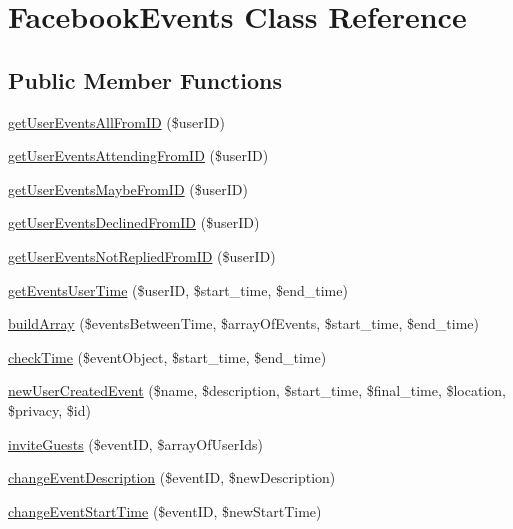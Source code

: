 \hypertarget{class_facebook_events}{
\section{FacebookEvents Class Reference}
\label{class_facebook_events}
}
\subsection*{Public Member Functions}
\begin{DoxyCompactItemize}
\item 
\hyperlink{class_facebook_events_aceabf698274599a0fc986f966aadb6ac}{getUserEventsAllFromID} (\$userID)
\item 
\hyperlink{class_facebook_events_a8dcdbfe286fc3b1290a7aa1fc20b79f9}{getUserEventsAttendingFromID} (\$userID)
\item 
\hyperlink{class_facebook_events_af08f78a39ff1e9f5fc2314e46411cb3b}{getUserEventsMaybeFromID} (\$userID)
\item 
\hyperlink{class_facebook_events_a89c184fbbc304311da7be09777e06962}{getUserEventsDeclinedFromID} (\$userID)
\item 
\hyperlink{class_facebook_events_a67ebbba9957c4c8862ea8579d952e2f9}{getUserEventsNotRepliedFromID} (\$userID)
\item 
\hyperlink{class_facebook_events_a750ef224c26f52fc33bcea71e7f952b0}{getEventsUserTime} (\$userID, \$start\_\-time, \$end\_\-time)
\item 
\hyperlink{class_facebook_events_ad8da519a91b9f6b34a69d521b3efe140}{buildArray} (\$eventsBetweenTime, \$arrayOfEvents, \$start\_\-time, \$end\_\-time)
\item 
\hyperlink{class_facebook_events_a5281d3844901979cb5404b168704f69a}{checkTime} (\$eventObject, \$start\_\-time, \$end\_\-time)
\item 
\hyperlink{class_facebook_events_ab0f25430d77364fda078b22836132ef1}{newUserCreatedEvent} (\$name, \$description, \$start\_\-time, \$final\_\-time, \$location, \$privacy, \$id)
\item 
\hyperlink{class_facebook_events_ac1644cdcd8ffe2d972ade073f045275f}{inviteGuests} (\$eventID, \$arrayOfUserIds)
\item 
\hyperlink{class_facebook_events_a179a0644435900e37bf3f7d2d58cf29c}{changeEventDescription} (\$eventID, \$newDescription)
\item 
\hyperlink{class_facebook_events_aa09249e284319de7b3f082aacef4a42d}{changeEventStartTime} (\$eventID, \$newStartTime)

\end{DoxyCompactItemize}
